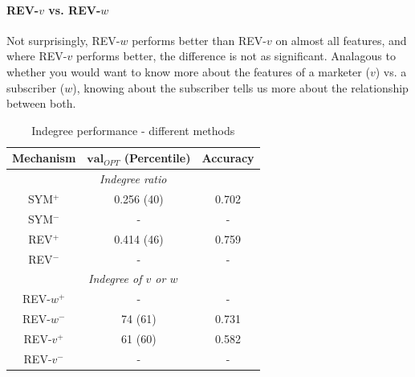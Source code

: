 \documentclass[conference]{IEEEtran}
\begin{document}
\paragraph{REV-$v$ vs. REV-$w$}
Not surprisingly, REV-$w$ performs better than REV-$v$ on almost all features, and where REV-$v$ performs better, the difference is not as significant. Analagous to whether you would want to know more about the features of a marketer ($v$) vs. a subscriber ($w$), knowing about the subscriber tells us more about the relationship between both.

\begin{table}[!t]
\renewcommand{\arraystretch}{1.3}
\caption{Indegree performance - different methods}
\label{table_recresults_indeg}
\centering
\begin{tabular}{|c||c|c|}
\hline
\bf{Mechanism} & $\mathbf{val}_{OPT}$ (Percentile) & \bf{Accuracy} \\
\hline
\multicolumn{3}{|c|}{\emph{Indegree ratio}} \\
\hline
SYM$^+$ & 0.256 (40) & 0.702 \\
SYM$^-$ & - & - \\
REV$^+$ & 0.414 (46) & 0.759 \\
REV$^-$ & - & - \\
\hline
\multicolumn{3}{|c|}{\emph{Indegree of $v$ or $w$}} \\
\hline
REV-$w^+$ & - & - \\
REV-$w^-$ & 74 (61) & 0.731 \\
REV-$v^+$ &  61 (60) & 0.582 \\
REV-$v^-$ & - & - \\
\hline
\end{tabular}
\end{table}
\end{document}
